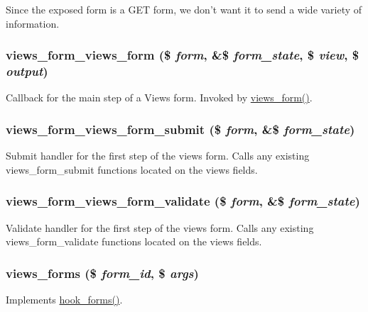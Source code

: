 Since the exposed form is a GET form, we don't want it to send a wide variety of information. \hypertarget{views_8module_a0597f9e730eb438da7c5e91eb9eec685}{
\subsubsection[{views\_\-form\_\-views\_\-form}]{\setlength{\rightskip}{0pt plus 5cm}views\_\-form\_\-views\_\-form (\$ {\em form}, \/  \&\$ {\em form\_\-state}, \/  \$ {\em view}, \/  \$ {\em output})}}
\label{views_8module_a0597f9e730eb438da7c5e91eb9eec685}
Callback for the main step of a Views form. Invoked by \hyperlink{views_8module_ad2b3623cab717e77713170df21927c92}{views\_\-form()}. \hypertarget{views_8module_a7fbf15fdfa7d026d5d8735d86d1c3fcf}{
\subsubsection[{views\_\-form\_\-views\_\-form\_\-submit}]{\setlength{\rightskip}{0pt plus 5cm}views\_\-form\_\-views\_\-form\_\-submit (\$ {\em form}, \/  \&\$ {\em form\_\-state})}}
\label{views_8module_a7fbf15fdfa7d026d5d8735d86d1c3fcf}
Submit handler for the first step of the views form. Calls any existing views\_\-form\_\-submit functions located on the views fields. \hypertarget{views_8module_a1d7ebdb64055b2c813237617e8be7241}{
\subsubsection[{views\_\-form\_\-views\_\-form\_\-validate}]{\setlength{\rightskip}{0pt plus 5cm}views\_\-form\_\-views\_\-form\_\-validate (\$ {\em form}, \/  \&\$ {\em form\_\-state})}}
\label{views_8module_a1d7ebdb64055b2c813237617e8be7241}
Validate handler for the first step of the views form. Calls any existing views\_\-form\_\-validate functions located on the views fields. \hypertarget{views_8module_afed058cc3f58a834a8c72c0a8129032b}{
\subsubsection[{views\_\-forms}]{\setlength{\rightskip}{0pt plus 5cm}views\_\-forms (\$ {\em form\_\-id}, \/  \$ {\em args})}}
\label{views_8module_afed058cc3f58a834a8c72c0a8129032b}
Implements \hyperlink{group__hooks_gaa764fee74b85797f75c0c923cad628d5}{hook\_\-forms()}.

